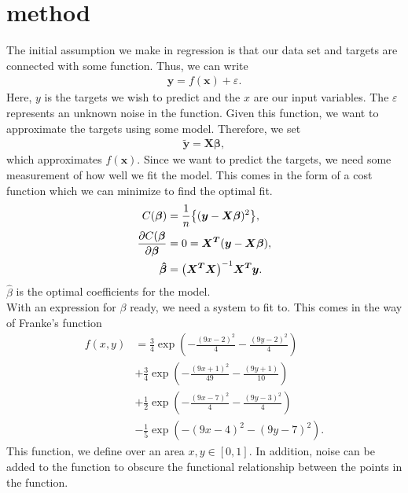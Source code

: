 \documentclass[15pt comic sans]{revtex4-2}
\begin{document}
\section{method}
The initial assumption we make in regression is that our data set and targets are connected with
some function. Thus, we can write 
\begin{align}
	\bm{y} = f(\bm{x}) + \varepsilon.
\end{align}
Here, $y$ is the targets we wish to predict and the $x$ are our input variables. The $\varepsilon$ 
represents an unknown noise in the function. Given this function, we want to approximate the targets
using some model. Therefore, we set
\begin{align}
	\bm{\tilde{y}} = \bm{X}\bm{\beta},
\end{align}
which approximates $f(\bm{x})$. Since we want to predict the targets, we need some measurement of
how well we fit the model. This comes in the form of a cost function which we can minimize to find 
the optimal fit. 
\begin{align}
	C(\bm{\beta}) &= \frac{1}{n} \big\{ ( \bm{y} - \bm{X}\bm{\beta} )^2 \big\} ,
	\label{costfunc}\\
	\pdv{C(\bm{\beta}}{\bm{\beta}} &= 0 = \bm{X^T}\qty(\bm{y} - \bm{X}\bm{\beta}), \\
	\bm{\hat{\beta}} &= \qty(\bm{X^T}\bm{X})^{-1} \bm{X^T}\bm{y}.
	 \label{betaoptimal}
\end{align}
$\hat{\beta}$ is the optimal coefficients for the model.\cite{hastie2009elements} \cite{morten2020lecturenotes} \\


With an expression for $\beta$ ready, we need a system to fit to. This comes in the way of
Franke's function\cite{franke1979critical}
\begin{align}
 f(x,y) &= \frac{3}{4}\exp{\left(-\frac{(9x-2)^2}{4} - \frac{(9y-2)^2}{4}\right)} 
	\nonumber\\
		&+\frac{3}{4}\exp{\left(-\frac{(9x+1)^2}{49}- \frac{(9y+1)}{10}\right)} 
	\nonumber\\
		&+\frac{1}{2}\exp{\left(-\frac{(9x-7)^2}{4} - \frac{(9y-3)^2}{4}\right)} 
	\nonumber\\
		&-\frac{1}{5}\exp{\left(-(9x-4)^2 - (9y-7)^2\right) }.
\label{franke}
\end{align}
This function, we define over an area $x, y \in [0, 1]$. In addition, noise can be added to the 
function to obscure the functional relationship between the points in the function.
\end{document}
